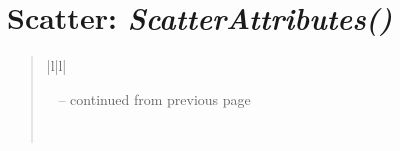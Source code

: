 \documentclass[letterpaper,10pt,english]{sphinxmanual}
\begin{document}
\section{\textbf{Scatter}: \emph{ScatterAttributes()}}
\label{attributes:scatter-scatterattributes}
\begin{DUlineblock}{0em}
\item[] 
\end{DUlineblock}
\begin{quote}

\begin{longtable}{|l|l|}
\hline
\endfirsthead

%
{{\textsf{\tablename\ \thetable{} -- continued from previous page}}} \\
\hline
\endhead

\hline {} \\ \hline
\endfoot

\endlastfoot



\end{longtable}
\end{quote}
\end{document}
